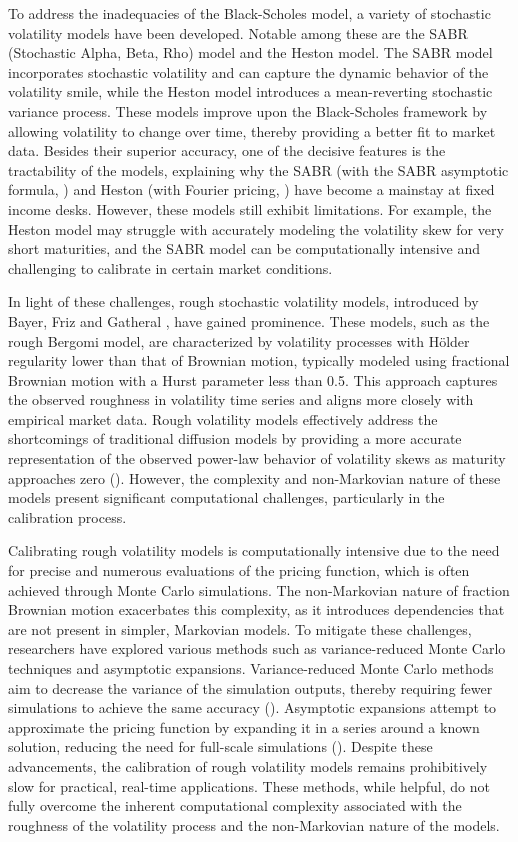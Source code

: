 \documentclass{article}
\theoremstyle{remark}
\begin{document}
To address the inadequacies of the Black-Scholes model, a variety of stochastic volatility models have been developed.
Notable among these are the SABR (Stochastic Alpha, Beta, Rho) model and the Heston model.
The SABR model incorporates stochastic volatility and can capture the dynamic behavior of the volatility smile,
while the Heston model introduces a mean-reverting stochastic variance process.
These models improve upon the Black-Scholes framework by allowing volatility to change over time,
thereby providing a better fit to market data.
Besides their superior accuracy, one of the decisive features is the tractability of the models, explaining why the SABR
(with the SABR asymptotic formula, \cite{Hagan1}) and Heston (with Fourier pricing, \cite{Hes93}) have become a mainstay at fixed income desks.
However, these models still exhibit limitations.
For example, the Heston model may struggle with accurately modeling the volatility skew for very short maturities,
and the SABR model can be computationally intensive and challenging to calibrate in certain market conditions.

In light of these challenges, rough stochastic volatility models, introduced by Bayer, Friz and Gatheral \cite{BFG15},  have gained prominence.
These models, such as the rough Bergomi model, are characterized by volatility processes with H\"older regularity lower
than that of Brownian motion, typically modeled using fractional Brownian motion with a Hurst parameter less than 0.5.
This approach captures the observed roughness in volatility time series and aligns more closely with empirical market data.
Rough volatility models effectively address the shortcomings of traditional diffusion models by providing a more accurate
representation of the observed power-law behavior of volatility skews as maturity approaches zero (\cite{AlosLeon, BFG15, BFGHS, Fukasawa}).
However, the complexity and non-Markovian nature of these models present significant computational challenges,
particularly in the calibration process.

Calibrating rough volatility models is computationally intensive due to the need for precise and numerous evaluations
of the pricing function, which is often achieved through Monte Carlo simulations.
The non-Markovian nature of fraction Brownian motion exacerbates this complexity, as it introduces dependencies
that are not present in simpler, Markovian models.
To mitigate these challenges, researchers have explored various methods such as variance-reduced Monte Carlo techniques and asymptotic expansions.
Variance-reduced Monte Carlo methods aim to decrease the variance of the simulation outputs, thereby requiring fewer simulations to achieve the same accuracy (\cite{BFGMS17, BFG15, HJM17, MP18}).
Asymptotic expansions attempt to approximate the pricing function by expanding it in a series around a known solution, reducing the need
for full-scale simulations (\cite{BFGHS, FZ17}).
Despite these advancements, the calibration of rough volatility models remains prohibitively slow for practical, real-time applications.
These methods, while helpful, do not fully overcome the inherent computational complexity associated with the roughness
of the volatility process and the non-Markovian nature of the models.
\end{document}
